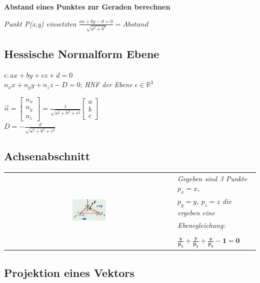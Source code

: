 \textbf{Abstand eines Punktes zur Geraden berechnen}

\textit{Punkt P(x,y) einsetzten $\frac{a x + b y - d = 0}{\sqrt{a^2 + b^2}} = Abstand$}

\subsection{Hessische Normalform Ebene}

$\epsilon: ax + by + cz + d = 0$ \\

$n_x x + n_y y + n_z z - D = 0$;
\textit{HNF der Ebene $\epsilon \in \mathbb{R}^3$}

$\vec{n} = \begin{bmatrix}
    n_x \\
    n_y \\
    n_z
\end{bmatrix} = \frac{1}{\sqrt{a^2 + b^2 + c^2}} \begin{bmatrix}
    a \\
    b \\
    c
\end{bmatrix} $ \\
$D = - \frac{d}{\sqrt{a^2 + b^2 + c^2}}$

\subsection{Achsenabschnitt}

\begin{tabular}{cl}
    \multirow{5}{*}{
        \includegraphics[width=0.2\textwidth]{assets/hnfachsenabschnitt.png}
    }
    & \textit{Gegeben sind 3 Punkte $p_x = x$, } \\
    & \textit{$p_y = y$, $p_z = z$ die ergeben eine } \\
    & \textit{Ebenegleichung:} \\
    & \\
    & $\mathbf{\frac{x}{p_x} + \frac{y}{p_y} + \frac{z}{p_z} - 1 = 0}$ \\
\end{tabular}

\subsection{Projektion eines Vektors}

